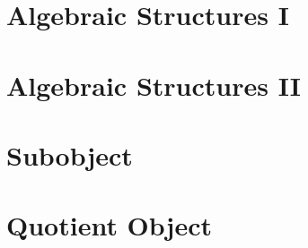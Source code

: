 \section{Algebraic Structures I}








\section{Algebraic Structures II}







\section{Subobject}







\section{Quotient Object}



